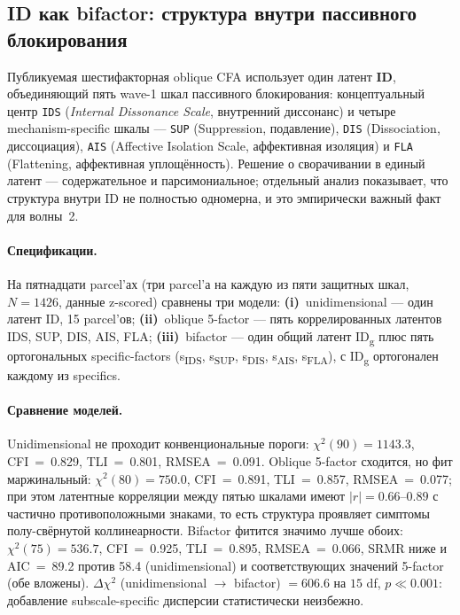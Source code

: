 \subsection{ID как bifactor: структура внутри пассивного блокирования}
\label{subsec:id_bifactor}

Публикуемая шестифакторная oblique CFA использует один латент \textbf{ID}, объединяющий пять wave-1 шкал пассивного блокирования: концептуальный центр \texttt{IDS} (\emph{Internal Dissonance Scale}, внутренний диссонанс) и четыре mechanism-specific шкалы --- \texttt{SUP} (Suppression, подавление), \texttt{DIS} (Dissociation, диссоциация), \texttt{AIS} (Affective Isolation Scale, аффективная изоляция) и \texttt{FLA} (Flattening, аффективная уплощённость). Решение о сворачивании в единый латент --- содержательное и парсимониальное; отдельный анализ показывает, что структура внутри ID не полностью одномерна, и это эмпирически важный факт для волны~2.

\paragraph{Спецификации.} На пятнадцати parcel'ах (три parcel'а на каждую из пяти защитных шкал, $N = 1426$, данные z-scored) сравнены три модели: \textbf{(i)}~unidimensional --- один латент ID, 15 parcel'ов; \textbf{(ii)}~oblique 5-factor --- пять коррелированных латентов IDS, SUP, DIS, AIS, FLA; \textbf{(iii)}~bifactor --- один общий латент ID\textsubscript{g} плюс пять ортогональных specific-factors (s\textsubscript{IDS}, s\textsubscript{SUP}, s\textsubscript{DIS}, s\textsubscript{AIS}, s\textsubscript{FLA}), с ID\textsubscript{g} ортогонален каждому из specifics.

\paragraph{Сравнение моделей.} Unidimensional не проходит конвенциональные пороги: $\chi^2(90) = 1143.3$, CFI~=~0.829, TLI~=~0.801, RMSEA~=~0.091. Oblique 5-factor сходится, но фит маржинальный: $\chi^2(80) = 750.0$, CFI~=~0.891, TLI~=~0.857, RMSEA~=~0.077; при этом латентные корреляции между пятью шкалами имеют $|r| = 0.66$--$0.89$ с частично противоположными знаками, то есть структура проявляет симптомы полу-свёрнутой коллинеарности. Bifactor фитится значимо лучше обоих: $\chi^2(75) = 536.7$, CFI~=~0.925, TLI~=~0.895, RMSEA~=~0.066, SRMR ниже и AIC~=~89.2 против 58.4 (unidimensional) и соответствующих значений 5-factor (обе вложены). $\Delta\chi^2$ (unidimensional $\to$ bifactor) $= 606.6$ на $15$ df, $p \ll 0.001$: добавление subscale-specific дисперсии статистически неизбежно.

